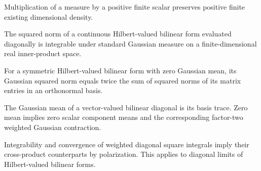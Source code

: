 \begin{lemma}
\label{lem:density-positive-scalar}

Multiplication of a measure by a positive finite scalar preserves positive finite existing dimensional density.
\end{lemma}

\begin{lemma}
\label{lem:gaussian-bilinear-norm-integrable}

The squared norm of a continuous Hilbert-valued bilinear form evaluated diagonally is integrable under standard Gaussian measure on a finite-dimensional real inner-product space.
\end{lemma}

\begin{lemma}
\label{lem:gaussian-vector-bilinear-wick}

For a symmetric Hilbert-valued bilinear form with zero Gaussian mean, its Gaussian squared norm equals twice the sum of squared norms of its matrix entries in an orthonormal basis.
\end{lemma}

\begin{lemma}
\label{lem:gaussian-vector-trace-contractions}

The Gaussian mean of a vector-valued bilinear diagonal is its basis trace. Zero mean implies zero scalar component means and the corresponding factor-two weighted Gaussian contraction.
\end{lemma}

\begin{lemma}
\label{lem:weighted-integral-polarization}

Integrability and convergence of weighted diagonal square integrals imply their cross-product counterparts by polarization. This applies to diagonal limits of Hilbert-valued bilinear forms.
\end{lemma}

